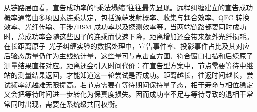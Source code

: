 从链路层面看，宣告成功率的“乘法塌缩”往往最先显现\cite{Reiserer2022CavityEnhancedNetworkNodes,vanleent2022entangling}。远程纠缠建立的宣告成功概率通常由多项因素连乘决定，包括源端发射概率、收集与耦合效率、QFC 转换效率、光纤传输、干涉/BSM 成功率以及探测效率等\cite{Azuma2023QuantumRepeatersReview}。当两端链路都要同时成功时，总成功率会随这些因子的连乘而快速下降，距离增加还会带来额外光纤损耗\cite{vanleent2022entangling}。在长距离原子--光子纠缠实验的数据处理中，宣告事件率、投影事件占比及其对应后验态质量仍作为主线统计量，这些量可与点击直方图、符合窗口扫描和后续原子测量结果直接对应\cite{BarrettKok2005EfficientHighFidelityQC,vanleent2022entangling,zhou2024longlived}。距离还会引入时间代价：在宣告型方案中，节点需要等待中继站的测量结果返回，才能知道这一轮尝试是否成功\cite{Azuma2023QuantumRepeatersReview,zhou2024longlived}。距离越长，往返时间越长，尝试频率就越难无限提高。若节点需要在等待期间保持量子态，相干寿命与相位稳定又会把等待时间进一步转化为保真度损失\cite{zhou2024longlived}。因而成功率不足与等待导致的退相干常常同时出现，需要在系统级共同权衡\cite{zhou2024longlived}。

